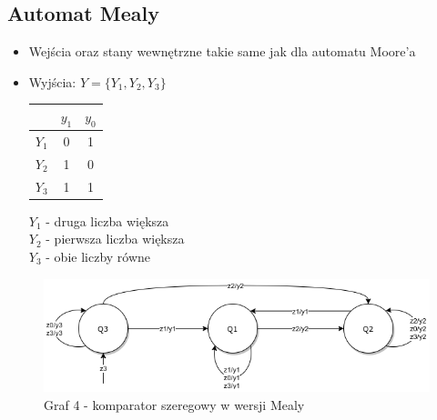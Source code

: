 \documentclass[12pt,a4paper]{article}
\begin{document}
		\subsection{Automat Mealy}
		\begin{itemize}
			\item Wejścia oraz stany wewnętrzne takie same jak dla automatu Moore'a
			
			\item Wyjścia: \(Y=\{Y_1, Y_2, Y_3\}\)\\
			
			\begin{minipage}{{.5\textwidth}}
				\centering
				\begin{tabular}{r|cc}
					&	\(y_1\)	&	\(y_0\)\\\hline
					\(Y_1\)	&	0	&	1	\\
					\(Y_2\)	&	1	&	0	\\
					\(Y_3\)	&	1	&	1	\\
				\end{tabular}
			\end{minipage}%
			\begin{minipage}{{.5\textwidth}}	
				\(Y_1\) - druga liczba większa\\
				\(Y_2\) - pierwsza liczba większa\\
				\(Y_3\) - obie liczby równe\\
			\end{minipage}
		\end{itemize}
		
		\begin{figure}[H]
			\centering
			\includegraphics[width=.75\textwidth]{schem/diag4.png}
			\\
			\vspace{.1cm}
			Graf 4 - komparator szeregowy w wersji Mealy
		\end{figure}
	
	
\end{document}
